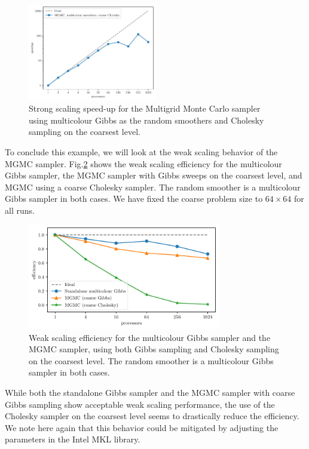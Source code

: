 \documentclass[
fontsize=11pt,
paper=a4,
numbers=noenddot
]{scrartcl}
\begin{document}
\begin{figure}[htbp]
    \centering
    \includegraphics[width=0.5\textwidth]{plots/strong_scaling_mgmc+mg+cholesky_4097x4097.pdf}
    \caption{Strong scaling speed-up for the Multigrid Monte Carlo sampler using multicolour Gibbs as the random smoothers and Cholesky sampling on the coarsest level.}
    \label{fig:2d_structured_mgmc_chol_ss}
\end{figure}

To conclude this example, we will look at the weak scaling behavior of the MGMC sampler. Fig.\ref{fig:2d_structured_ws} shows the weak scaling efficiency for the multicolour Gibbs sampler, the MGMC sampler with Gibbs sweeps on the coarsest level, and MGMC using a coarse Cholesky sampler. The random smoother is a multicolour Gibbs sampler in both cases. We have fixed the coarse problem size to $64 \times 64$ for all runs.

\begin{figure}[htbp]
    \centering
    \includegraphics[width=0.75\textwidth]{plots/weak_scaling_64x64.pdf}
    \caption{Weak scaling efficiency for the multicolour Gibbs sampler and the MGMC sampler, using both Gibbs sampling and Cholesky sampling on the coarsest level. The random smoother is a multicolour Gibbs sampler in both cases.}
    \label{fig:2d_structured_ws}
\end{figure}

While both the standalone Gibbs sampler and the MGMC sampler with coarse Gibbs sampling show acceptable weak scaling performance, the use of the Cholesky sampler on the coarsest level seems to drastically reduce the efficiency. We note here again that this behavior could be mitigated by adjusting the parameters in the Intel MKL library.
\end{document}
